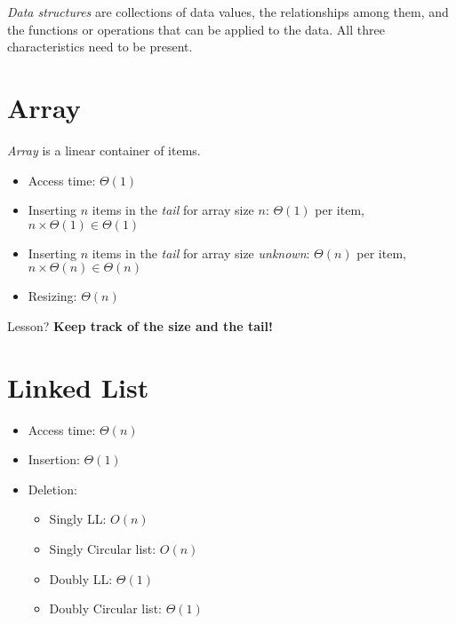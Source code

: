 
\textit{Data structures} are collections of data values, the relationships among them, and the functions or operations that can be applied to the data. All three characteristics need to be present.

\section{Array}

\textit{Array} is a linear container of items.

\begin{center}
\end{center}

\begin{itemize}
  \item Access time: $\Theta (1)$
  \item Inserting $n$ items in the \textit{tail} for array size $n$: $\Theta(1)$ per item, $n \times \Theta(1) \in \Theta(1)$
  \item Inserting $n$ items in the \textit{tail} for array size \textit{unknown}: $\Theta(n)$ per item, $n \times \Theta(n) \in \Theta(n)$
  \item Resizing: $\Theta (n)$
\end{itemize}

Lesson? \textbf{Keep track of the size and the tail!}

\section{Linked List}

\begin{itemize}
  \item Access time: $\Theta (n)$
  \item Insertion: $\Theta(1)$
  \item Deletion:
    \begin{itemize}
      \item Singly LL: $O(n)$
      \item Singly Circular list: $O(n)$
      \item Doubly LL: $\Theta (1)$
      \item Doubly Circular list: $\Theta (1)$
    \end{itemize}
\end{itemize}

